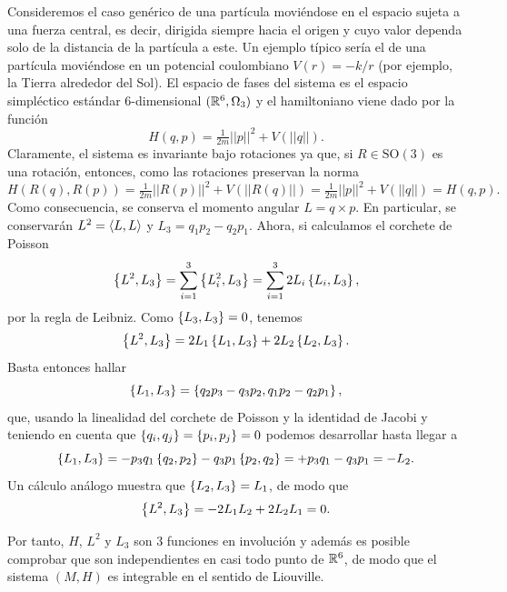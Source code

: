   Consideremos el caso genérico de una partícula moviéndose en el espacio sujeta a una fuerza central, es decir, dirigida siempre hacia el origen y cuyo valor dependa solo de la distancia de la partícula a este. Un ejemplo típico sería el de una partícula moviéndose en un potencial coulombiano $V(r)=-k/r$ (por ejemplo, la Tierra alrededor del Sol). El espacio de fases del sistema es el espacio simpléctico estándar $6$-dimensional $(\mathbb{R}^6,\Omega_3)$ y el hamiltoniano viene dado por la función
  \begin{equation*}
    H(q,p)=\tfrac{1}{2m}||p||^2+V(||q||).
  \end{equation*}
  Claramente, el sistema es invariante bajo rotaciones ya que, si $R\in \mathrm{SO}(3)$ es una rotación, entonces, como las rotaciones preservan la norma
  \begin{equation*}
    H(R(q),R(p))=\tfrac{1}{2m}||R(p)||^2+V(||R(q)||)=\tfrac{1}{2m}||p||^2+V(||q||)=H(q,p).
  \end{equation*}
  Como consecuencia, se conserva el momento angular $L=q\times p$. En particular, se conservarán $L^2=\left\langle L,L\right\rangle$ y $L_3=q_1p_2-q_2p_1$. Ahora, si calculamos el corchete de Poisson
  \begin{equation*}
    \left\lbrace L^2,L_3\right\rbrace=\sum_{i=1}^3\left\lbrace L_i^2,L_3\right\rbrace=\sum_{i=1}^32L_i\left\lbrace L_i,L_3\right\rbrace,
  \end{equation*}
  por la regla de Leibniz. Como $\left\lbrace L_3,L_3\right\rbrace=0$, tenemos 
  \begin{equation*}
    \left\lbrace L^2,L_3\right\rbrace=2L_1\left\lbrace L_1,L_3\right\rbrace+2L_2\left\lbrace L_2,L_3\right\rbrace.
  \end{equation*}
  Basta entonces hallar 
  \begin{equation*}
    \left\lbrace L_1,L_3\right\rbrace=\left\lbrace q_2p_3-q_3p_2,q_1p_2-q_2p_1\right\rbrace,
  \end{equation*}
  que, usando la linealidad del corchete de Poisson y la identidad de Jacobi y teniendo en cuenta que $\left\lbrace q_i,q_j\right\rbrace=\left\lbrace p_i,p_j\right\rbrace=0$ podemos desarrollar hasta llegar a
  \begin{equation*}
    \left\lbrace L_1,L_3\right\rbrace=-p_3q_1\left\lbrace q_2,p_2\right\rbrace-q_3p_1\left\lbrace p_2,q_2\right\rbrace=+p_3q_1-q_3p_1=-L_2.
  \end{equation*}
Un cálculo análogo muestra que $\left\lbrace L_2,L_3\right\rbrace=L_1$, de modo que
\begin{equation*}
  \left\lbrace L^2,L_3\right\rbrace=-2L_1L_2+2L_2L_1=0.
\end{equation*}

Por tanto, $H$, $L^2$ y $L_3$ son $3$ funciones en involución y además es posible comprobar que son independientes en casi todo punto de $\mathbb{R}^6$, de modo que el sistema $(M,H)$ es integrable en el sentido de Liouville.

